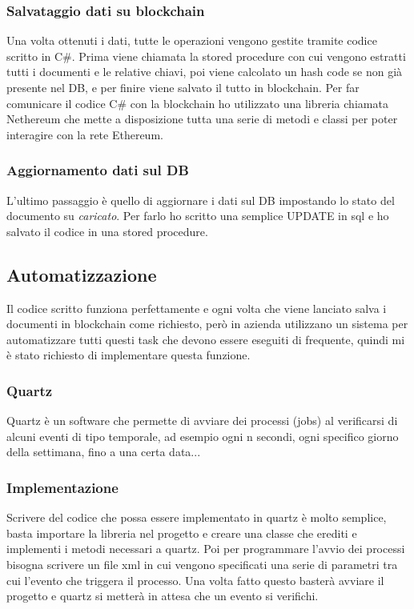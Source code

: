         \subsubsection{Salvataggio dati su blockchain}
        Una volta ottenuti i dati, tutte le operazioni vengono gestite tramite codice scritto in C\#. Prima viene chiamata la stored procedure con cui vengono estratti tutti i documenti e le relative chiavi, poi viene calcolato un hash code se non già presente nel DB, e per finire viene salvato il tutto in blockchain. Per far comunicare il codice C\# con la blockchain ho utilizzato una libreria chiamata Nethereum che mette a disposizione tutta una serie di metodi e classi per poter interagire con la rete Ethereum. 
        
        \subsubsection{Aggiornamento dati sul DB}
        L'ultimo passaggio è quello di aggiornare i dati sul DB impostando lo stato del documento su \textit{caricato}. Per farlo ho scritto una semplice UPDATE in sql e ho salvato il codice in una stored procedure.
        
    
    \subsection{Automatizzazione}
    Il codice scritto funziona perfettamente e ogni volta che viene lanciato salva i documenti in blockchain come richiesto, però in azienda utilizzano un sistema per automatizzare tutti questi task che devono essere eseguiti di frequente, quindi mi è stato richiesto di implementare questa funzione.
        \subsubsection{Quartz}
        Quartz è un software che permette di avviare dei processi (jobs) al verificarsi di alcuni eventi di tipo temporale, ad esempio ogni n secondi, ogni specifico giorno della settimana, fino a una certa data...\\
        
        \subsubsection{Implementazione}
        Scrivere del codice che possa essere implementato in quartz è molto semplice, basta importare la libreria nel progetto e creare una classe che erediti e implementi i metodi necessari a quartz.
        Poi per programmare l'avvio dei processi bisogna scrivere un file xml in cui vengono specificati una serie di parametri tra cui l'evento che triggera il processo. Una volta fatto questo basterà avviare il progetto e quartz si metterà in attesa che un evento si verifichi.

